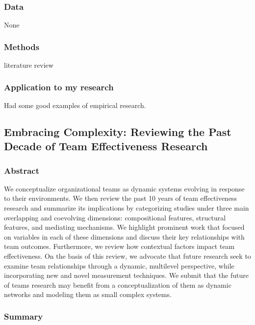 \documentclass[12pt]{article}
\begin{document}
\subsubsection*{Data}

None

\subsubsection*{Methods}

literature review

\subsubsection*{Application to my research}

Had some good examples of empirical research.


\subsection*{Embracing Complexity: Reviewing the Past Decade of Team Effectiveness Research\cite{embracing_complexity}}

\subsubsection*{Abstract}
We conceptualize organizational teams as dynamic systems evolving in response to their environments. We then review the past 10 years of team effectiveness research and summarize its implications by categorizing studies under three main overlapping and coevolving dimensions: compositional features, structural features, and mediating mechanisms. We highlight prominent work that focused on variables in each of these dimensions and discuss their key relationships with team outcomes. Furthermore, we review how contextual factors impact team effectiveness. On the basis of this review, we advocate that future research seek to examine team relationships through a dynamic, multilevel perspective, while incorporating new and novel measurement techniques. We submit that the future of teams research may benefit from a conceptualization of them as dynamic networks and modeling them as small complex systems.
\subsubsection*{Summary}
\end{document}
